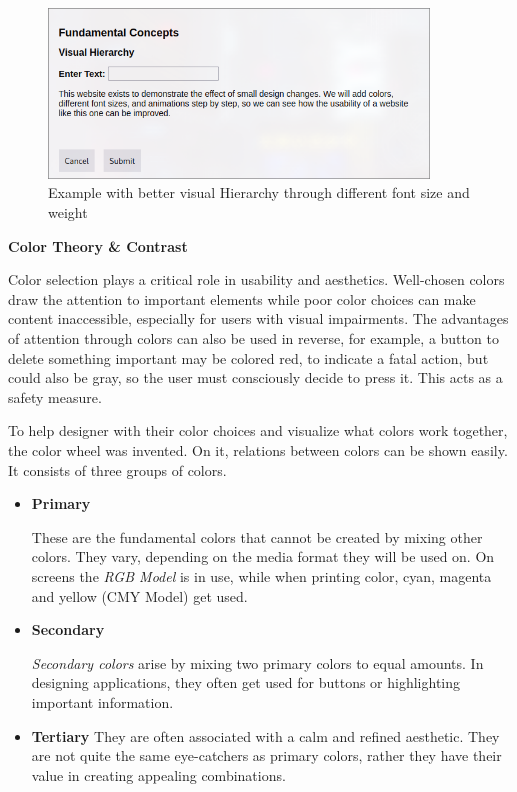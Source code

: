     \blankLine

    \begin{figure} [H]
        \center
        \includegraphics [width=0.9\textwidth] {images/paul/usabilityExamples/visualHierarchy.png}
        \caption{Example with better visual Hierarchy through different font size and weight}
    \end{figure}

\blankLine

\textbf{Color Theory \& Contrast}

Color selection plays a critical role in usability and aesthetics. Well-chosen colors draw the attention to important elements while poor color choices can make content inaccessible, especially for users with visual impairments. The advantages of attention through colors can also be used in reverse, for example, a button to delete something important may be colored red, to indicate a fatal action, but could also be gray, so the user must consciously decide to press it. This acts as a safety measure. 

\blankLine

To help designer with their color choices and visualize what colors work together, the color wheel was invented. On it, relations between colors can be shown easily. It consists of three groups of colors. 

\begin{itemize}
    \item \textbf{Primary}
    
    These are the fundamental colors that cannot be created by mixing other colors. They vary, depending on the media format they will be used on. On screens the \textit{RGB Model} is in use, while when printing color, cyan, magenta and yellow (CMY Model) get used.

    \item \textbf{Secondary}
    
    \textit{Secondary colors} arise by mixing two primary colors to equal amounts. In designing applications, they often get used for buttons or highlighting important information.

    \item \textbf{Tertiary}
    They are often associated with a calm and refined aesthetic. They are not quite the same eye-catchers as primary colors, rather they have their value in creating appealing combinations.
    
\end{itemize}

